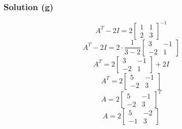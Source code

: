 \documentclass[12pt]{article}
\begin{document}
\subsubsection*{Solution (g)}
\[
  A^T - 2I = 2\begin{bmatrix}
    1 & 1\\ 
    2 & 3 
  \end{bmatrix}^{-1}
\]
\[
  A^T - 2I = 2 \cdot \frac{1}{3 - 2}\begin{bmatrix}
    3 & -1\\ 
    -2 & 1 
  \end{bmatrix}
\]
\[
  A^T = 2\begin{bmatrix}
    3 & -1\\ 
    -2 & 1 
  \end{bmatrix} + 2I 
\]
\[
  A^T = 2\begin{bmatrix}
    5 & -1\\ 
    -2 & 3 
  \end{bmatrix}
\]
\[
  A = 2\begin{bmatrix}
    5 & -1\\ 
    -2 & 3 
  \end{bmatrix}^T 
\]
\vspace{0.25in}
\[
  A = 2\begin{bmatrix}
    5 & -2\\ 
    -1 & 3 
  \end{bmatrix}
\]
\vspace{0.5in}
\end{document}
